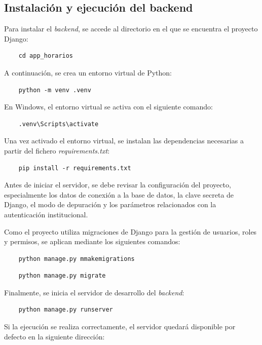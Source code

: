 \subsection{Instalación y ejecución del backend}

Para instalar el \textit{backend}, se accede al directorio en el que se encuentra el proyecto Django:

\begin{verbatim}
	cd app_horarios
\end{verbatim}

A continuación, se crea un entorno virtual de Python:

\begin{verbatim}
	python -m venv .venv
\end{verbatim}

En Windows, el entorno virtual se activa con el siguiente comando:

\begin{verbatim}
	.venv\Scripts\activate
\end{verbatim}

Una vez activado el entorno virtual, se instalan las dependencias necesarias a partir del fichero \textit{requirements.txt}:

\begin{verbatim}
	pip install -r requirements.txt
\end{verbatim}

Antes de iniciar el servidor, se debe revisar la configuración del proyecto, especialmente los datos de conexión a la base de datos, la clave secreta de Django, el modo de depuración y los parámetros relacionados con la autenticación institucional.

Como el proyecto utiliza migraciones de Django para la gestión de usuarios, roles y permisos, se aplican mediante los siguientes comandos:

\begin{verbatim}
	python manage.py mmakemigrations
\end{verbatim}

\begin{verbatim}
	python manage.py migrate
\end{verbatim}

Finalmente, se inicia el servidor de desarrollo del \textit{backend}:

\begin{verbatim}
	python manage.py runserver
\end{verbatim}

Si la ejecución se realiza correctamente, el servidor quedará disponible por defecto en la siguiente dirección:

